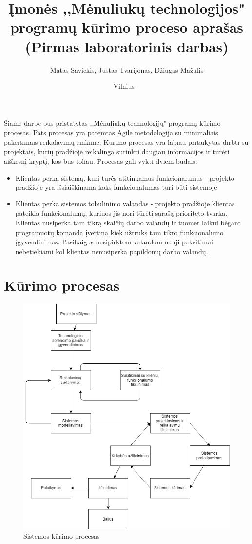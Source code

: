 \documentclass{VUMIFPSkursinis}
\title{Įmonės ,,Mėnuliukų technologijos" programų kūrimo proceso aprašas (Pirmas laboratorinis darbas)}
\author{Matas Savickis, Justas Tvarijonas, Džiugas Mažulis}
\date{Vilnius – \the\year}
\begin{document}
\maketitle

\tableofcontents

	Šiame darbe bus pristatytas ,,Mėnuliukų technologijų" programų kūrimo procesas.
	Pats procesas yra paremtas Agile metodologija su minimaliais pakeitimais reikalavimų rinkime.
	Kūrimo procesas yra labiau pritaikytas dirbti su projektais, kurių pradžioje reikalinga surinkti daugiau informacijos ir tūrėti aiškesnį kryptį, kas bus toliau. Procesas gali vykti dviem būdais:
	\begin{itemize}
		\item{Klientas perka sistemą, kuri turės atitinkamus funkcionalumus - projekto pradžioje yra išsiaiškinama koks funkcionalumas turi būti sistemoje}
		\item{
			Klientas perka sistemos tobulinimo valandas - projekto pradžioje klientas pateikia funkcionalumų, kuriuos jis nori tūrėti sąrašą prioriteto tvarka.
			Klientas nusiperka tam tikrą skaičių darbo valandų ir tuomet laikui bėgant programuotų komanda įvertina kiek užtruks tam tikro funkcionalumo įgyvendinimas.
			Pasibaigus nusipirktom valandom nauji pakeitimai nebetiekiami kol klientas nenusiperka papildomų darbo valandų.
		}
\end{itemize}
\section{Kūrimo procesas}

	\begin{figure}[H]
	\centering
	\includegraphics[scale=0.7]{img/SoftwareProcessMoonTechnologies}
	\caption{Sistemos kūrimo procesas} %
	\label{img:kurimoProcesas}
	\end{figure}
\end{document}
